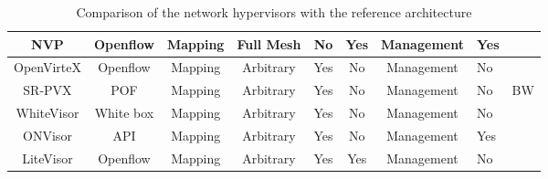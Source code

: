 \begin{table}[ht]
{\begin{tabular}{|c|c|c|c|c|c|c|l|c|}
NVP                      & Openflow                  & Mapping       & Full Mesh     & No  & Yes & Management & Yes      &                    \\ \hline
OpenVirteX               & Openflow                  & Mapping       & Arbitrary     & Yes & No  & Management & No       &                    \\ \hline
SR-PVX                   & POF                       & Mapping       & Arbitrary     & Yes & No  & Management & No       & BW                 \\ \hline
WhiteVisor               & White box                 & Mapping       & Arbitrary     & Yes & No  & Management & No       &                    \\ \hline
ONVisor                  & API                       & Mapping       & Arbitrary     & Yes & No  & Management & Yes      &                    \\ \hline
LiteVisor                & Openflow                  & Mapping       & Arbitrary     & Yes & Yes & Management & No       &                    \\ \hline
\end{tabular}%
}
\caption{Comparison of the network hypervisors with the reference architecture}
\label{tab:comparison-refarchi}
\end{table}